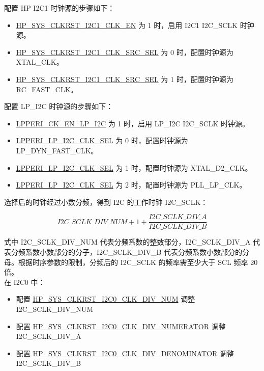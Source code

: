 \documentclass[main\_\_CN.tex]{subfiles}
\begin{document}
配置 HP I2C1 时钟源的步骤如下：
\begin{itemize}
    \item \hyperref[fielddesc:HPSYSCLKRSTI2C1CLKEN]{HP\_SYS\_CLKRST\_I2C1\_CLK\_EN} 为 1 时，启用 I2C1 I2C\_SCLK 时钟源。
    \item \hyperref[fielddesc:HPSYSCLKRSTI2C1CLKSRCSEL]{HP\_SYS\_CLKRST\_I2C1\_CLK\_SRC\_SEL} 为 0 时，配置时钟源为 XTAL\_CLK。
    \item \hyperref[fielddesc:HPSYSCLKRSTI2C1CLKSRCSEL]{HP\_SYS\_CLKRST\_I2C1\_CLK\_SRC\_SEL} 为 1 时，配置时钟源为 RC\_FAST\_CLK。
\end{itemize}

配置 LP\_I2C 时钟源的步骤如下：
\begin{itemize}
    \item \hyperref[fielddesc:LPPERICKENLPI2C]{LPPERI\_CK\_EN\_LP\_I2C} 为 1 时，启用 LP\_I2C I2C\_SCLK 时钟源。
    \item \hyperref[fielddesc:LPPERILPI2CCLKSEL]{LPPERI\_LP\_I2C\_CLK\_SEL} 为 0 时，配置时钟源为 LP\_DYN\_FAST\_CLK。
    \item \hyperref[fielddesc:LPPERILPI2CCLKSEL]{LPPERI\_LP\_I2C\_CLK\_SEL} 为 1 时，配置时钟源为 XTAL\_D2\_CLK。
    \item \hyperref[fielddesc:LPPERILPI2CCLKSEL]{LPPERI\_LP\_I2C\_CLK\_SEL} 为 2 时，配置时钟源为 PLL\_LP\_CLK。
\end{itemize}

选择后的时钟经过小数分频，得到 I2C 的工作时钟 I2C\_SCLK：

\[
I2C\_SCLK\_DIV\_NUM + 1+\frac{ I2C\_SCLK\_DIV\_A}{I2C\_SCLK\_DIV\_B}
\]

式中 I2C\_SCLK\_DIV\_NUM 代表分频系数的整数部分，I2C\_SCLK\_DIV\_A 代表分频系数小数部分的分子，I2C\_SCLK\_DIV\_B 代表分频系数小数部分的分母。根据时序参数的限制，分频后的 I2C\_SCLK 的频率需至少大于 SCL 频率 20 倍。\\

在 I2C0 中：
\begin{itemize}
    \item 配置 \hyperref[fielddesc:HPSYSCLKRSTI2C0CLKDIVNUM]{HP\_SYS\_CLKRST\_I2C0\_CLK\_DIV\_NUM} 调整 I2C\_SCLK\_DIV\_NUM
    \item 配置 \hyperref[fielddesc:HPSYSCLKRSTI2C0CLKDIVNUMERATOR]{HP\_SYS\_CLKRST\_I2C0\_CLK\_DIV\_NUMERATOR} 调整 I2C\_SCLK\_DIV\_A
    \item 配置 \hyperref[fielddesc:HPSYSCLKRSTI2C0CLKDIVDENOMINATOR]{HP\_SYS\_CLKRST\_I2C0\_CLK\_DIV\_DENOMINATOR} 调整 I2C\_SCLK\_DIV\_B
\end{itemize}
\end{document}
